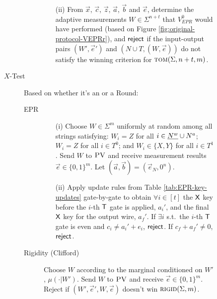 \begin{figure}[H]
\begin{description}
\begin{description}
\begin{enumerate}
		\item[(ii)]
		From $\vec{x}$, $\vec{c}$, $\vec{z}$, $\vec{a}$, $\vec{b}$ and $\vec{e}$, determine the adaptive measurements $W\in\Sigma^{n+t}$ that $V_{EPR}^0$ would have performed (based on Figure \ref{fig:original-protocol-VEPRr}), and $\sf reject$ if the input-output pairs $(W',\vec{e}')$ and $(N\cup T,(W,\vec{e}))$ do not satisfy the winning criterion for $\textsc{tom}(\Sigma,n+t,m)$.
		\end{enumerate}
	\end{description}
\item[$X$-Test] Based on whether it's an  or a  Round:
\begin{description}
	\item[EPR] 
	\begin{enumerate}
		\item[(i)] Choose $W\in\Sigma^m$ uniformly at random among all strings
      satisfying: $W_i=Z$ for all $i\in \highlight{N^w} \cup N^a$; $W_i=Z$ for all $i\in T^0$; and $W_i\in\{X,Y\}$ for all $i\in T^1$. Send $W$ to $\textsc{PV}$ and receive measurement results $\vec{e}\in\{0,1\}^m$. Let $(\vec{a},\vec{b})=(\vec{e}_N,0^n)$. 
		\item[(ii)] Apply update rules from Table \ref{tab:EPR-key-updates} gate-by-gate to obtain $\forall i\in [t]$ the $\sf X$ key before the $i$-th $\sf T$ gate is applied, $a_i'$, and the final $\sf X$ key for the output wire, $a_f'$. 
If $\exists i$ s.t.\ the $i$-th $\sf T$ gate is even and $c_i\neq a_i'+e_i$, $\sf reject$. If $c_f+a_f'\neq 0$, $\sf reject$. 
	\end{enumerate}
	\item[Rigidity (Clifford)] Choose ${W}$ according to the marginal conditioned on ${W}'$, $\mu(\cdot|{W}')$. 
	Send ${W}$ to $\textsc{PV}$ and receive $\vec{e}\in\{0,1\}^m$. Reject if   $({W}',\vec{e}',{W},\vec{e})$ doesn't win $\textsc{rigid}(\Sigma,m)$. 
\end{description}


\end{description}
\end{figure}

